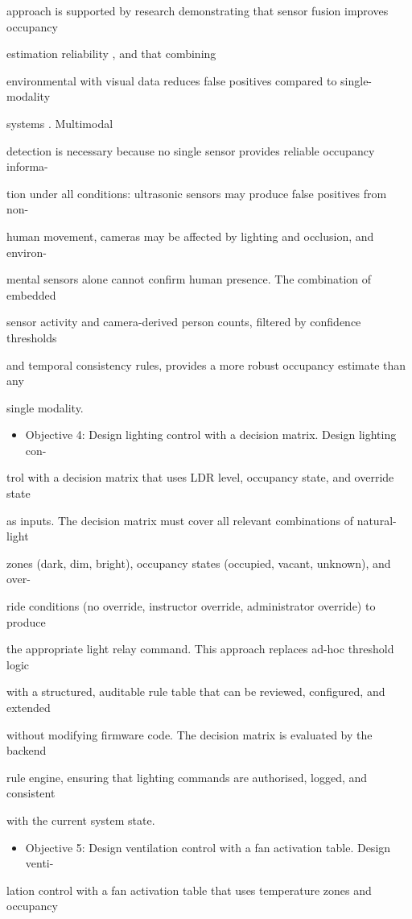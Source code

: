 approach is supported by research demonstrating that sensor fusion improves occupancy

estimation reliability \cite{tanaka2024,patel2024,lindqvist2025}, and that combining

environmental with visual data reduces false positives compared to single-modality

systems \cite{nakajima2025,dupont2025}. Multimodal

detection is necessary because no single sensor provides reliable occupancy informa-

tion under all conditions: ultrasonic sensors may produce false positives from non-

human movement, cameras may be affected by lighting and occlusion, and environ-

mental sensors alone cannot conﬁrm human presence. The combination of embedded

sensor activity and camera-derived person counts, ﬁltered by conﬁdence thresholds

and temporal consistency rules, provides a more robust occupancy estimate than any

single modality.

\begin{itemize}
  \item Objective 4: Design lighting control with a decision matrix. Design lighting con-
\end{itemize}
trol with a decision matrix that uses LDR level, occupancy state, and override state

as inputs. The decision matrix must cover all relevant combinations of natural-light

zones (dark, dim, bright), occupancy states (occupied, vacant, unknown), and over-

ride conditions (no override, instructor override, administrator override) to produce

the appropriate light relay command. This approach replaces ad-hoc threshold logic

with a structured, auditable rule table that can be reviewed, conﬁgured, and extended

without modifying ﬁrmware code. The decision matrix is evaluated by the backend

rule engine, ensuring that lighting commands are authorised, logged, and consistent

with the current system state.

\begin{itemize}
  \item Objective 5: Design ventilation control with a fan activation table. Design venti-
\end{itemize}
lation control with a fan activation table that uses temperature zones and occupancy


